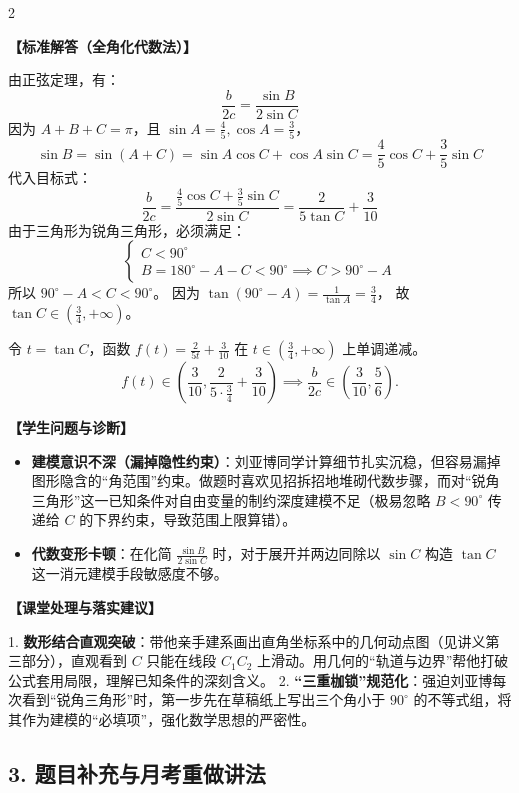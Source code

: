 \documentclass[11pt,a4paper]{ctexart}
\newcommand{\teachblock}[2]{%
  \par\addvspace{0.45em}%
  \noindent\textbf{【#1】}\par
  \begingroup
    \setlength{\parskip}{0.35em}%
    #2\par
  \endgroup
}
\begin{document}
\begin{paracol}{2}
\teachblock{标准解答（全角化代数法）}{
  由正弦定理，有：
  \[
    \frac{b}{2c} = \frac{\sin B}{2\sin C}
  \]
  因为 $A + B + C = \pi$，且 $\sin A = \frac{4}{5}, \cos A = \frac{3}{5}$，
  \[
    \sin B = \sin(A+C) = \sin A\cos C + \cos A\sin C = \frac{4}{5}\cos C + \frac{3}{5}\sin C
  \]
  代入目标式：
  \[
    \frac{b}{2c} = \frac{\frac{4}{5}\cos C + \frac{3}{5}\sin C}{2\sin C} = \frac{2}{5\tan C} + \frac{3}{10}
  \]
  由于三角形为锐角三角形，必须满足：
  \[
    \begin{cases}
      C < 90^\circ \\
      B = 180^\circ - A - C < 90^\circ \implies C > 90^\circ - A
    \end{cases}
  \]
  所以 $90^\circ - A < C < 90^\circ$。
  因为 $\tan(90^\circ - A) = \frac{1}{\tan A} = \frac{3}{4}$，
  故 $\tan C \in (\frac{3}{4}, +\infty)$。\par
  令 $t = \tan C$，函数 $f(t) = \frac{2}{5t} + \frac{3}{10}$ 在 $t \in (\frac{3}{4}, +\infty)$ 上单调递减。
  \[
    f(t) \in \left(\frac{3}{10}, \frac{2}{5 \cdot \frac{3}{4}} + \frac{3}{10}\right) \implies \frac{b}{2c} \in \left(\frac{3}{10}, \frac{5}{6}\right).
  \]
}

\switchcolumn
\teachblock{学生问题与诊断}{
  \begin{itemize}
    \item \textbf{建模意识不深（漏掉隐性约束）}：刘亚博同学计算细节扎实沉稳，但容易漏掉图形隐含的“角范围”约束。做题时喜欢见招拆招地堆砌代数步骤，而对“锐角三角形”这一已知条件对自由变量的制约深度建模不足（极易忽略 $B < 90^\circ$ 传递给 $C$ 的下界约束，导致范围上限算错）。
    \item \textbf{代数变形卡顿}：在化简 \(\frac{\sin B}{2\sin C}\) 时，对于展开并两边同除以 \(\sin C\) 构造 \(\tan C\) 这一消元建模手段敏感度不够。
  \end{itemize}
}

\teachblock{课堂处理与落实建议}{
  1. \textbf{数形结合直观突破}：带他亲手建系画出直角坐标系中的几何动点图（见讲义第三部分），直观看到 $C$ 只能在线段 $C_1C_2$ 上滑动。用几何的“轨道与边界”帮他打破公式套用局限，理解已知条件的深刻含义。
  2. \textbf{“三重枷锁”规范化}：强迫刘亚博每次看到“锐角三角形”时，第一步先在草稿纸上写出三个角小于 $90^\circ$ 的不等式组，将其作为建模的“必填项”，强化数学思想的严密性。
}
\end{paracol}

\newpage

\subsection{3. 题目补充与月考重做讲法}
\end{document}
